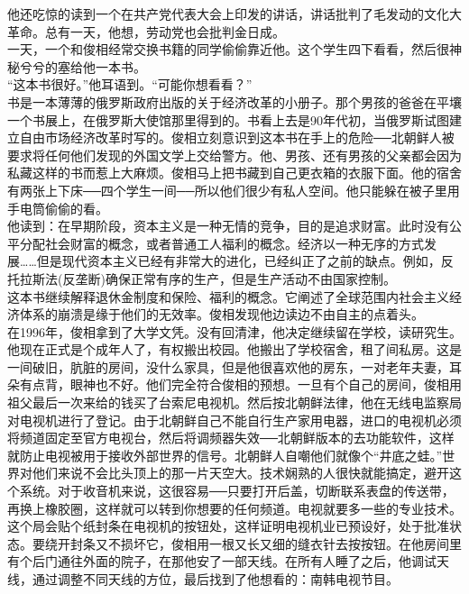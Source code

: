 他还吃惊的读到一个在共产党代表大会上印发的讲话，讲话批判了毛发动的文化大革命。总有一天，他想，劳动党也会批判金日成。\\

一天，一个和俊相经常交换书籍的同学偷偷靠近他。这个学生四下看看，然后很神秘兮兮的塞给他一本书。\\

“这本书很好。”他耳语到。“可能你想看看？”\\

书是一本薄薄的俄罗斯政府出版的关于经济改革的小册子。那个男孩的爸爸在平壤一个书展上，在俄罗斯大使馆那里得到的。书看上去是90年代初，当俄罗斯试图建立自由市场经济改革时写的。俊相立刻意识到这本书在手上的危险──北朝鲜人被要求将任何他们发现的外国文学上交给警方。他、男孩、还有男孩的父亲都会因为私藏这样的书而惹上大麻烦。俊相马上把书藏到自己更衣箱的衣服下面。他的宿舍有两张上下床──四个学生一间──所以他们很少有私人空间。他只能躲在被子里用手电筒偷偷的看。\\

他读到：在早期阶段，资本主义是一种无情的竞争，目的是追求财富。此时没有公平分配社会财富的概念，或者普通工人福利的概念。经济以一种无序的方式发展……但是现代资本主义已经有非常大的进化，已经纠正了之前的缺点。例如，反托拉斯法(反垄断)确保正常有序的生产，但是生产活动不由国家控制。\\

这本书继续解释退休金制度和保险、福利的概念。它阐述了全球范围内社会主义经济体系的崩溃是缘于他们的无效率。俊相发现他边读边不由自主的点着头。\\

在1996年，俊相拿到了大学文凭。没有回清津，他决定继续留在学校，读研究生。他现在正式是个成年人了，有权搬出校园。他搬出了学校宿舍，租了间私房。这是一间破旧，肮脏的房间，没什么家具，但是他很喜欢他的房东，一对老年夫妻，耳朵有点背，眼神也不好。他们完全符合俊相的预想。一旦有个自己的房间，俊相用祖父最后一次来给的钱买了台索尼电视机。然后按北朝鲜法律，他在无线电监察局对电视机进行了登记。由于北朝鲜自己不能自行生产家用电器，进口的电视机必须将频道固定至官方电视台，然后将调频器失效──北朝鲜版本的去功能软件，这样就防止电视被用于接收外部世界的信号。北朝鲜人自嘲他们就像个“井底之蛙。”世界对他们来说不会比头顶上的那一片天空大。技术娴熟的人很快就能搞定，避开这个系统。对于收音机来说，这很容易──只要打开后盖，切断联系表盘的传送带，再换上橡胶圈，这样就可以转到你想要的任何频道。电视就要多一些的专业技术。\\

这个局会贴个纸封条在电视机的按钮处，这样证明电视机业已预设好，处于批准状态。要绕开封条又不损坏它，俊相用一根又长又细的缝衣针去按按钮。在他房间里有个后门通往外面的院子，在那他安了一部天线。在所有人睡了之后，他调试天线，通过调整不同天线的方位，最后找到了他想看的：南韩电视节目。\\

